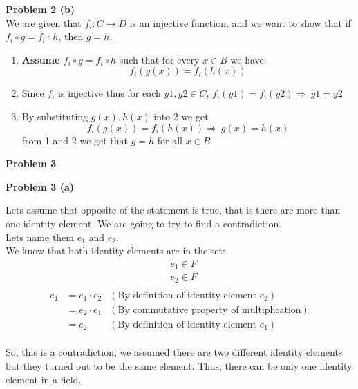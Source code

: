 \documentclass{article}
\begin{document}
\begin{flushleft}
   \textbf{\Large Problem 2 (b)}\\
   We are given that \( f_i : C \to D \) is an injective function, and we want to show that if \( f_i \circ g = f_i \circ h \), then \( g = h \).
   \begin{enumerate}
      \item \textbf{Assume \( f_i \circ g = f_i \circ h \)} such that for every \(x \in B\) we have:\\
      \[ 
      f_i(g(x)) =f_i(h(x))
      \]
      \item Since \(f_i\) is injective thus for each \(y1,y2 \in C\), \(f_i(y1)=f_i(y2) \Rightarrow\ y1=y2\)
      \item By substituting \( g(x) ,h(x)\) into 2 we get 
      \[f_i(g(x))=f_i(h(x)) \Rightarrow\ g(x)=h(x)\]
      from 1 and 2 we get that \(g=h\) for all \(x \in B\)
   \end{enumerate}
\end{flushleft}




\begin{flushleft}
   \textbf{\Large Problem 3}
\end{flushleft}


\begin{flushleft}
   \textbf{\Large Problem 3 (a)}
\end{flushleft}

Lets assume that opposite of the statement is true, that is there are more than one identity element. We are going to try to find a contradiction. \\
Lets name them \(e_1\) and \(e_2\). \\
We know that both identity elements are in the set:
\begin{align*}
   & e_1 \in F \\
   & e_2 \in F \\
\end{align*}
\begin{align}
   e_1 & = e_1 \cdot e_2 & (\text{By definition of identity element \(e_2\)}) \\
       & = e_2 \cdot e_1 & (\text{By commutative property of multiplication}) \\
       & = e_2           & (\text{By definition of identity element \(e_1\)})
\end{align}
\\
So, this is a contradiction, we assumed there are two different identity elements but they turned out to be the same element. Thus, there can be only one identity element in a field. \\
\end{document}
